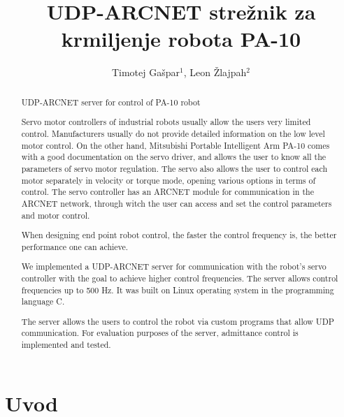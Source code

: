 \documentclass[a4paper]{article}
\begin{document}
\title{UDP-ARCNET strežnik za krmiljenje robota PA-10}

\author{Timotej Gašpar$^{1}$, Leon Žlajpah$^{2}$} %



\maketitle


\begin{abstract}{UDP-ARCNET server for control of PA-10 robot}

Servo motor controllers of industrial robots usually allow the users very limited control. Manufacturers usually do not provide detailed information on the low level motor control. On the other hand, Mitsubishi Portable Intelligent Arm PA-10 comes with a good documentation on the servo driver, and allows the user to know all the parameters of servo motor regulation. The servo also allows the user to control each motor separately in velocity or torque mode, opening various options in terms of control. The servo controller has an ARCNET module for communication in the ARCNET network, through witch the user can access and set the control parameters and motor control.

When designing end point robot control, the faster the control frequency is, the better performance one can achie\-ve. 

We implemented a UDP-ARCNET server for communication with the robot's servo controller with the goal to achieve higher control frequencies. The server allows control frequencies up to 500 Hz. It was built on Linux operating system in the programming language C.

The server allows the users to control the robot via custom programs that allow UDP communication. For evaluation purposes of the server, admittance control is implemented and tested.

\end{abstract}



\section{Uvod}
\end{document}
